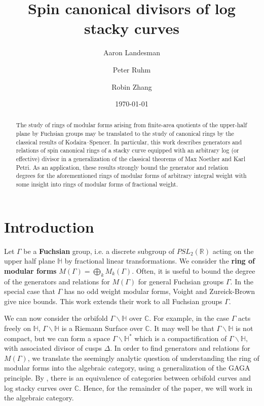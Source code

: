 \documentclass{amsart}
\title{Spin canonical divisors of log stacky curves}
\author{Aaron Landesman}
\author{Peter Ruhm}
\author{Robin Zhang}
\date{\today}
\theoremstyle{plain}
\theoremstyle{definition}
\theoremstyle{remark}
\numberwithin{equation}{section}
\newcommand\BH{{\mathbb H}}
\newcommand\BC{{\mathbb C}}
\newcommand\BR{{\mathbb R}}
\begin{document}
\begin{abstract}
  The study of rings of modular forms arising from finite-area
	quotients of the upper-half plane by Fuchsian groups may be
	translated to the study of canonical rings by the classical
	results of Kodaira--Spencer. In particular, this work describes
	generators and relations of spin canonical rings of a stacky
	curve equipped with an arbitrary log (or effective)	divisor in a
	generalization of the classical theorems of Max Noether	and Karl
	Petri. As an application, these results strongly bound the
	generator and relation degrees for the aforementioned rings
	of modular forms of arbitrary integral weight with some insight
	into rings of modular forms of fractional weight.
\end{abstract}

\maketitle


\section{Introduction}
Let $\Gamma$ be a {\bf Fuchsian} group, i.e. a discrete subgroup of
$PSL_2(\BR)$ acting on the upper half plane $\BH$ by fractional
linear transformations. We consider the {\bf ring of modular forms}
$M(\Gamma) = \bigoplus_k M_k(\Gamma)$. Often, it is useful to
bound the degree of the generators and relations for $M(\Gamma)$
for general Fuchsian groups $\Gamma$. In the special case that $\Gamma$
has no odd weight modular forms, Voight and Zureick-Brown
\cite[Chapters 7-9]{vzb:stacky} give nice bounds.
This work extends their work to all Fuchsian groups $\Gamma$.

We can now consider the orbifold $\Gamma \backslash \BH$ over $\BC$.
For example, in the case $\Gamma$ acts freely on $\BH$, $\Gamma
\backslash \BH$ is a Riemann Surface over $\BC$. It may well be
that $\Gamma \backslash \BH$ is not compact, but we can form a
space $\Gamma \backslash \BH^*$ which is a compactification of
$\Gamma \backslash \BH,$ with associated divisor of cusps $\Delta$.
In order to find generators and relations for $M(\Gamma)$, we
translate the seemingly analytic question of understanding the ring
of modular forms into the algebraic category, using a
generalization of the GAGA principle. By \cite[Proposition 6.1.5]
{vzb:stacky}, there is an equivalence of categories between orbifold
curves and log stacky curves over $\BC$. Hence, for the remainder
of the paper, we will work in the algebraic category.
\end{document}
